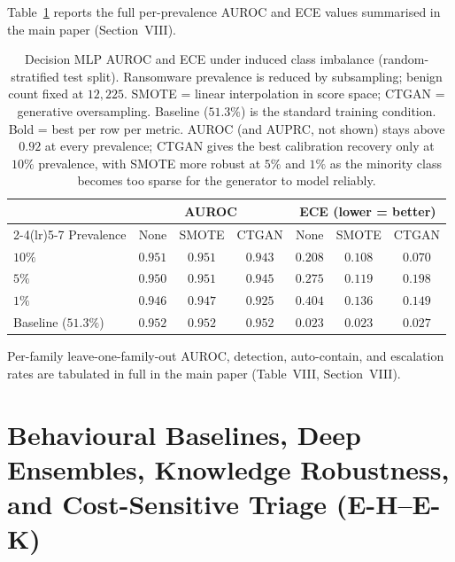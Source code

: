 \documentclass[journal]{IEEEtran}
\begin{document}
Table~\ref{tab:imbalance} reports the full per-prevalence AUROC and ECE
values summarised in the main paper (Section~VIII).

\begin{table}[h]
\centering
\footnotesize
\caption{Decision MLP AUROC and ECE under induced class imbalance
  (random-stratified test split). Ransomware prevalence is reduced by
  subsampling; benign count fixed at $12{,}225$. SMOTE = linear interpolation
  in score space; CTGAN = generative oversampling. Baseline ($51.3\%$) is the
  standard training condition. Bold = best per row per metric. AUROC
  (and AUPRC, not shown) stays above $0.92$ at every prevalence; CTGAN
  gives the best calibration recovery only at $10\%$ prevalence, with
  SMOTE more robust at $5\%$ and $1\%$ as the minority class becomes
  too sparse for the generator to model reliably.}
\label{tab:imbalance}
\setlength{\tabcolsep}{4pt}
\begin{tabular}{lcccccc}
\toprule
 & \multicolumn{3}{c}{AUROC} & \multicolumn{3}{c}{ECE (lower = better)} \\
\cmidrule(lr){2-4}\cmidrule(lr){5-7}
Prevalence & None & SMOTE & CTGAN & None & SMOTE & CTGAN \\
\midrule
$10\%$          & $0.951$ & $\mathbf{0.951}$ & $0.943$ & $0.208$ & $0.108$ & $\mathbf{0.070}$ \\
$5\%$           & $0.950$ & $\mathbf{0.951}$ & $0.945$ & $0.275$ & $\mathbf{0.119}$ & $0.198$ \\
$1\%$           & $0.946$ & $\mathbf{0.947}$ & $0.925$ & $0.404$ & $\mathbf{0.136}$ & $0.149$ \\
\midrule
Baseline ($51.3\%$) & $0.952$ & $0.952$ & $0.952$ & $\mathbf{0.023}$ & $\mathbf{0.023}$ & $0.027$ \\
\bottomrule
\end{tabular}
\end{table}

Per-family leave-one-family-out AUROC, detection, auto-contain, and
escalation rates are tabulated in full in the main paper (Table~VIII,
Section~VIII).

\section{Behavioural Baselines, Deep Ensembles, Knowledge Robustness, and Cost-Sensitive Triage (E-H--E-K)}\label{sec:supp_extra}
\end{document}
